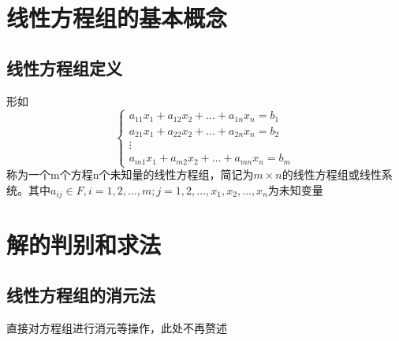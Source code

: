 \documentclass[UTF-8,a4paper]{ctexart}
\begin{document}
\section{线性方程组的基本概念}
\subsection{线性方程组定义}
形如
\[\begin{cases}
    a_{11}x_1 + a_{12}x_2 + \dots + a_{1n}x_n = b_1\\
    a_{21}x_1 + a_{22}x_2 + \dots + a_{2n}x_n = b_2\\
    \vdots \\
    a_{m1}x_1 + a_{m2}x_2 + \dots + a_{mn}x_n = b_m
\end{cases}
\]
称为一个m个方程n个未知量的线性方程组，简记为\(m \times n\)的线性方程组或线性系统。其中\(a_{ij} \in F, i=1,2,\dots ,m; j=1,2,\dots,  x_1 , x_2 , \dots , x_n\)为未知变量

\section{解的判别和求法}
\subsection{线性方程组的消元法} 直接对方程组进行消元等操作，此处不再赘述
\end{document}
